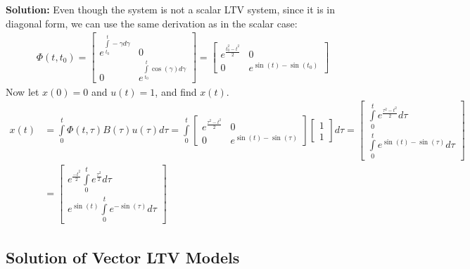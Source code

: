 \documentclass[twoside]{article}
\begin{document}
\textbf{Solution:} Even though the system is not a scalar LTV system, since it is in diagonal form, we can use the same derivation as in the scalar case:
%
\begin{align*}	
	\Phi(t , t_0) = \begin{bmatrix} e^{ \int\limits_{t_0}^{t} -\gamma d\gamma  } & 0 \\ 0 & e^{ \int\limits_{t_0}^{t} \cos(\gamma) d\gamma  } \end{bmatrix} 
	= \begin{bmatrix} e^{ \frac{t_0^2 - t^2}{2} } & 0 \\ 0 & e^{ \sin(t) - \sin(t_0)  } \end{bmatrix} 
\end{align*}	
%
Now let $x(0) = 0$ and $u(t) = 1$, and find $x(t)$.
%
\begin{align*}
x(t) &= \int\limits_{0}^{t} \Phi(t , \tau) B(\tau) u(\tau) d\tau = \int\limits_{0}^{t} \begin{bmatrix} e^{ \frac{\tau^2 - t^2}{2} } & 0 \\ 0 & e^{ \sin(t) - \sin(\tau)  } \end{bmatrix}  \begin{bmatrix} 1 \\ 1  \end{bmatrix} d\tau
= \begin{bmatrix} \int\limits_{0}^{t} e^{ \frac{\tau^2 - t^2}{2} } d\tau \\ \int\limits_{0}^{t} e^{ \sin(t) - \sin(\tau)  } d\tau \end{bmatrix}   
\\
&= \begin{bmatrix} e^{ \frac{- t^2}{2} } \int\limits_{0}^{t} e^{ \frac{\tau^2}{2} } d\tau \\ e^{ \sin(t) } \int\limits_{0}^{t} e^{ - \sin(\tau)  } d\tau \end{bmatrix}   
\end{align*}

\subsection{Solution of Vector LTV Models}
\end{document}
